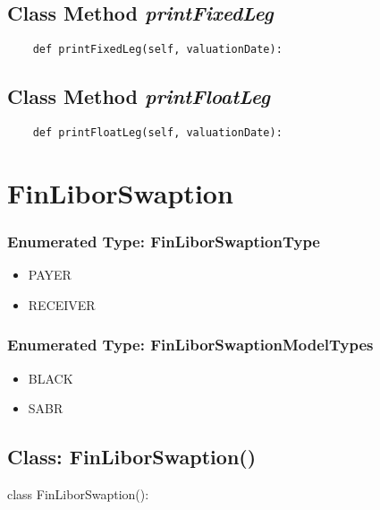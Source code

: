 \documentclass[twoside,11pt]{book}
\begin{document}
\subsection{Class Method {\it printFixedLeg}}


\begin{lstlisting}
    def printFixedLeg(self, valuationDate):
\end{lstlisting}

\subsection{Class Method {\it printFloatLeg}}


\begin{lstlisting}
    def printFloatLeg(self, valuationDate):
\end{lstlisting}

\newpage
\section{FinLiborSwaption}

\subsubsection{Enumerated Type: FinLiborSwaptionType}
\begin{itemize}
\item{PAYER}
\item{RECEIVER}
\end{itemize}

\subsubsection{Enumerated Type: FinLiborSwaptionModelTypes}
\begin{itemize}
\item{BLACK}
\item{SABR}
\end{itemize}

\subsection{Class: FinLiborSwaption()}
class FinLiborSwaption():
\end{document}
